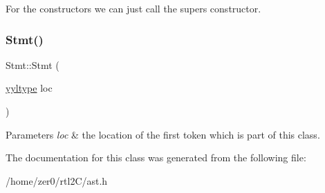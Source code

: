 For the constructors we can just call the super\textquotesingle{}s constructor. \mbox{\label{class_stmt_af71ea596ea1f0db2ebeb7e16241544c5}} 
\subsubsection{\texorpdfstring{Stmt()}{Stmt()}\hspace{0.1cm}{\footnotesize\ttfamily [2/2]}}
{\footnotesize\ttfamily Stmt\+::\+Stmt (\begin{DoxyParamCaption}\item[{\hyperlink{structyyltype}{yyltype}}]{loc }\end{DoxyParamCaption})\hspace{0.3cm}{\ttfamily [inline]}}


\begin{DoxyParams}{Parameters}
{\em loc} & the location of the first token which is part of this class. \\
\hline
\end{DoxyParams}


The documentation for this class was generated from the following file\+:\begin{DoxyCompactItemize}
\item 
/home/zer0/rtl2\+C/ast.\+h\end{DoxyCompactItemize}
